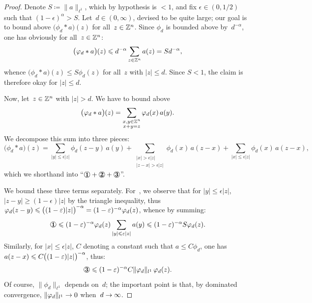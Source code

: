 \begingroup{}
\begin{proof}
Denote $S \coloneqq \|a\|_{\ell^1}$, which by hypothesis is $<1$,
and fix $\epsilon \in (0,1/2)$ such that $(1-\epsilon)^\alpha > S$.
Let~$d \in (0,\infty)$, devised to be quite large; our goal is to bound above
$\big(\phi_d * a\big)(z)$ for all~$z \in \mathbb{Z}^n$.
Since $\phi_d$ is bounded above by~$d^{-\alpha}$, one has obviously for all~$z \in \mathbb{Z}^n$:
\[\label{f2348} \big(\phi_d * a\big)(z) \leq d^{-\alpha} \sum_{z\in\ZZ^n} a(z) = S d^{-\alpha} ,\]
whence $\big(\phi_d * a\big)(z) \leq S \phi_d(z)$ for all~$z$ with $|z|\leq d$.
Since $S<1$, the claim is therefore okay for $|z|\leq d$. 

Now, let~$z\in\mathbb{Z}^n$ with $|z|>d$. We have to bound above
\[ \big(\phi_d*a\big)(z) = \sum_{\substack{x,y\in\ZZ^n\\x+y=z}} \phi_d(x)\,a(y) .\]
We decompose this sum into three pieces:
\[ \big(\phi_d*a\big)(z) = \sum_{|y|\leq\epsilon|z|} \phi_d(z-y)\,a(y) +
\sum_{\substack{|x|>\epsilon|z|\\|z-x|>\epsilon|z|}} \phi_d(x)\,a(z-x) +
\sum_{|x|\leq\epsilon|z|} \phi_d(x)\,a(z-x) ,\]
which we shorthand into ``$\onecirc + \twocirc + \threecirc$''.

We bound these three terms separately.
For~\onecirc, we observe that for $|y| \leq \epsilon|z|$, $|z-y| \geq (1-\epsilon)|z|$
by the triangle inequality, thus $\phi_d(z-y) \leq {\big((1-\epsilon)|z|\big)^{-\alpha}} \ab 
= (1-\epsilon)^{-\alpha} \phi_d(z)$, whence by summing:
\[\label{f1034a} \onecirc \leq (1-\epsilon)^{-\alpha} \phi_d(z) \sum_{|y|\leq\epsilon|z|} a(y)
\leq (1-\epsilon)^{-\alpha} S \phi_d(z) .\]
Similarly, for $|x| \leq \epsilon|z|$, $C$ denoting a constant such that $a\leq C\phi_d$,
one has ${a(z-x)} \ab \leq C\big((1-\epsilon)|z|\big)^{-\alpha}$, thus:
\[\label{f1034b} \threecirc \leq (1-\epsilon)^{-\alpha} C \|\phi_d\|_{\ell^1} \, \phi_d(z) .\]
Of course, $\|\phi_d\|_{\ell^1}$ depends on~$d$; the important point is that,
by dominated convergence, $\|\varphi_d\|_{l^1} \to 0$ when~$d \to \infty$.


\end{proof}
